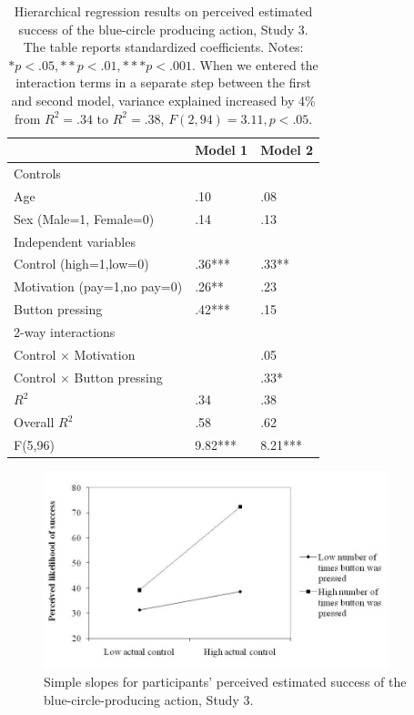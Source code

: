 \documentclass[USenglish,letterpaper,12pt,extrafontsizes,oneside,onecolumn,final]{memoir}
\begin{document}
\begin{table} 	
	\setlength{\extrarowheight}{4pt}
	\begin{tabulary}{\linewidth}{LLL}
	\toprule
	              & Model 1 & Model 2 \\
	\midrule
	Controls & & \\
	\quad Age           & .10 & .08 \\
	\quad Sex (Male=1, Female=0) & .14 & .13 \\
	Independent variables & & \\
	\quad Control (high=1,low=0) & .36*** & .33** \\
	\quad Motivation (pay=1,no pay=0) & .26** & .23 \\
	\quad Button pressing & .42*** & .15 \\
	2-way interactions & & \\
	\quad Control $\times$ Motivation & & .05 \\
	\quad Control $\times$ Button pressing & & .33* \\
	$R^2$ & .34 & .38 \\
	Overall $R^2$ & .58 & .62 \\
	F(5,96) & 9.82*** & 8.21*** \\	
	\bottomrule	 	
	\end{tabulary}
	\caption{Hierarchical regression results on perceived estimated success of the blue-circle producing action, Study 3. The table reports standardized coefficients. \small Notes: $* p < .05, ** p < .01,*** p < .001$. When we entered the interaction terms in a separate step between the first and second model, variance explained increased by 4\% from $R^2 = .34$ to $R^2 = .38$, $F(2, 94) = 3.11, p < .05$.\label{tab:ioc-4}}
\end{table}

\begin{figure}[t]
\begin{center}
\includegraphics[width=10cm]{ioc-fig-4}
\caption{\textsf{Simple slopes for participants' perceived estimated success of the blue-circle-producing action, Study 3.}\label{fig:ioc-fig-4}}
\end{center}
\end{figure}
\end{document}
